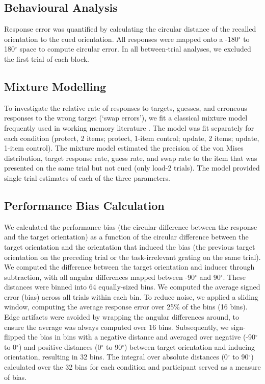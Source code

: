 \documentclass{article}
\begin{document}
\begin{normalsize}
\subsection{Behavioural Analysis}
Response error was quantified by calculating the circular distance of the recalled orientation to the cued orientation. All responses were mapped onto a -180$^{\circ}$ to 180$^{\circ}$ space to compute circular error. In all between-trial analyses, we excluded the first trial of each block.\\


\subsection{Mixture Modelling}
To investigate the relative rate of responses to targets, guesses, and erroneous responses to the wrong target (‘swap errors’), we fit a classical mixture model frequently used in working memory literature \parencite{Schneegans2017, Bays2009, Zhang2008}. The model was fit separately for each condition (protect, 2 items; protect, 1-item control; update, 2 items; update, 1-item control). The mixture model estimated the precision of the von Mises distribution, target response rate, guess rate, and swap rate to the item that was presented on the same trial but not cued (only load-2 trials). The model provided single trial estimates of each of the three parameters. \\

\subsection{Performance Bias Calculation}
We calculated the performance bias (the circular difference between the response and the target orientation) as a function of the circular difference between the target orientation and the orientation that induced the bias (the previous target orientation on the preceding trial or the task-irrelevant grating on the same trial). We computed the difference between the target orientation and inducer through subtraction, with all angular differences mapped between -90$^{\circ}$ and 90$^{\circ}$. These distances were binned into 64 equally-sized bins. We computed the average signed error (bias) across all trials within each bin. To reduce noise, we applied a sliding window, computing the average response error over 25\% of the bins (16 bins). Edge artifacts were avoided by wrapping the angular differences around, to ensure the average was always computed over 16 bins. Subsequently, we sign-flipped the bias in bins with a negative distance and averaged over negative (-90$^{\circ}$ to 0$^{\circ}$) and positive distances (0$^{\circ}$ to 90$^{\circ}$) between target orientation and inducing orientation, resulting in 32 bins. The integral over absolute distances (0$^{\circ}$ to 90$^{\circ}$) calculated over the 32 bins for each condition and participant served as a measure of bias. \\


\end{normalsize}
\end{document}
